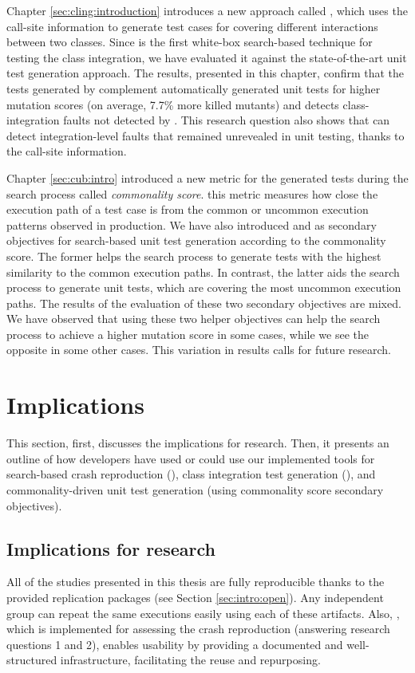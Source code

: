 Chapter \ref{sec:cling:introduction} introduces a new approach called \cling, which uses the call-site information to generate test cases for covering different interactions between two classes. Since \cling is the first white-box search-based technique for testing the class integration, we have evaluated it against the state-of-the-art unit test generation approach. The results, presented in this chapter, confirm that the tests generated by \cling complement automatically generated unit tests for higher mutation scores (on average, 7.7\% more killed mutants) and detects class-integration faults not detected by \evosuite. This research question also shows that \cling can detect integration-level faults that remained unrevealed in unit testing, thanks to the call-site information.


Chapter \ref{sec:cub:intro} introduced a new metric for the generated tests during the search process called \emph{commonality score}. this metric measures how close the execution path of a test case is from the common or uncommon execution patterns observed in production. We have also introduced \com and \ucom as secondary objectives for search-based unit test generation according to the commonality score. The former helps the search process to generate tests with the highest similarity to the common execution paths. In contrast, the latter aids the search process to generate unit tests, which are covering the most uncommon execution paths. The results of the evaluation of these two secondary objectives are mixed. We have observed that using these two helper objectives can help the search process to achieve a higher mutation score in some cases, while we see the opposite in some other cases. This variation in results calls for future research.



\section{Implications}

This section, first, discusses the implications for research. Then, it presents an outline of how developers have used or could use our implemented tools for search-based crash reproduction (\botsing), class integration test generation (\cling), and commonality-driven unit test generation (using commonality score secondary objectives).

\subsection{Implications for research}
All of the studies presented in this thesis are fully reproducible thanks to the provided replication packages (see Section \ref{sec:intro:open}). Any independent group can repeat the same executions easily using each of these artifacts.
Also, \exrunner, which is implemented for assessing the crash reproduction (answering research questions 1 and 2), enables usability by providing a documented and well-structured infrastructure, facilitating the reuse and repurposing.



